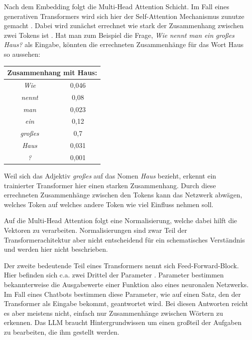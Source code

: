 	\clearpage
	\noindent
	Nach dem Embedding folgt die Multi-Head Attention Schicht.
	Im Fall eines generativen Transformers wird sich hier der Self-Attention Mechanismus zunutze gemacht \cite[S. 2f]{turner2024}. 
	Dabei wird zunächst errechnet wie stark der Zusammenhang zwischen zwei Tokens ist \cite[S. 4]{vaswani2017}. Hat man zum 
	Beispiel die Frage, \emph{Wie nennt man ein großes Haus?} als Eingabe, könnten die errechneten Zusammenhänge für das 
	Wort Haus so aussehen: 
	
	\vspace{5mm}
	\begin{tabular}{ |c|c| }
  		\hline
	  	\multicolumn{2}{|c|}{Zusammenhang mit Haus: } \\
	  	\hline
	  	\emph{Wie} & 0,046 \\
	  	\hline
	  	\emph{nennt} & 0,08 \\
		\hline
	  	\emph{man} & 0,023 \\
	  	\hline
		\emph{ein} & 0,12 \\
	  	\hline
		\emph{großes} & 0,7 \\
	  	\hline
		\emph{Haus} & 0,031 \\
		\hline
		\emph{?} & 0,001 \\
		\hline
	\end{tabular}
	\vspace{5mm}
	
	\noindent Weil sich das Adjektiv \emph{großes} auf das Nomen \emph{Haus} bezieht, erkennt ein trainierter Transformer hier
	einen starken Zusammenhang. Durch diese errechneten Zusammenhänge zwischen den Tokens kann das Netzwerk abwägen, welches
	Token auf welches andere Token wie viel Einfluss nehmen soll.
		
	Auf die Multi-Head Attention folgt eine Normalisierung, welche dabei hilft die Vektoren zu verarbeiten. 
	Normalisierungen sind zwar Teil der Transformerachitektur aber nicht entscheidend für ein schematisches Verständnis
	und werden hier nicht beschrieben\cite[S.3]{vaswani2017}. 
	
	Der zweite bedeutende Teil eines Transformers nennt sich Feed-Forward-Block. Hier befinden sich c.a. 
	zwei Drittel der Parameter \cite{geva2024}. Parameter bestimmen bekannterweise die Ausgabewerte einer Funktion 
	also eines neuronalen Netzwerks. Im Fall eines Chatbots bestimmen diese Parameter, wie auf einen Satz, den der Transformer als 
	Eingabe bekommt, geantwortet wird. Bei diesen Antworten reicht es aber meistens nicht, einfach nur Zusammenhänge zwischen Wörtern 
	zu erkennen. Das LLM braucht Hintergrundwissen um einen großteil der Aufgaben zu bearbeiten, die ihm gestellt werden. 
	
